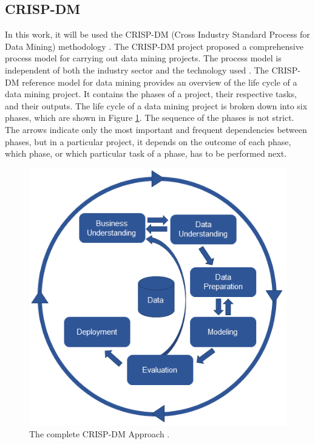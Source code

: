 \subsection{CRISP-DM}
\label{sub:crisp_dm}

In this work, it will be used the CRISP-DM (Cross Industry Standard Process for Data Mining) methodology \cite{CRISPDM}.
The CRISP-DM project proposed a comprehensive process model for carrying out data mining projects. The process model is independent of both the industry sector and the technology used \cite{CRISPDM}. 
The CRISP-DM reference model for data mining provides an overview of the life cycle of a data
mining project. It contains the phases of a project, their respective tasks, and their outputs.
The life cycle of a data mining project is broken down into six phases, which are shown in Figure \ref{fig:crisp_dm}.
The sequence of the phases is not strict. The arrows indicate only the most important and frequent
dependencies between phases, but in a particular project, it depends on the outcome of each phase,
which phase, or which particular task of a phase, has to be performed next.

\begin{figure}[H]
\centering
\includegraphics[width=0.8\linewidth]{Chapters/img/crisp_dm.png}
\caption{The complete CRISP-DM Approach  \cite{WEBSITE:CRISPDM}.  }
\label{fig:crisp_dm}
\end{figure}

